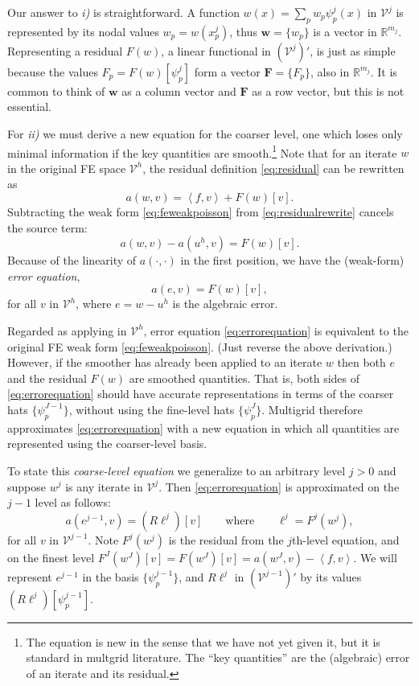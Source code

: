 \documentclass[letterpaper,final,12pt,reqno]{amsart}
\theoremstyle{claim}
\newcommand{\RR}{\mathbb{R}}
\newcommand{\bw}{\mathbf{w}}
\newcommand{\bF}{\mathbf{F}}
\newcommand{\ip}[2]{\left<#1,#2\right>}
\numberwithin{equation}{section}
\numberwithin{figure}{section}
\numberwithin{table}{section}
\numberwithin{theorem}{section}
\begin{document}
Our answer to \emph{i)} is straightforward.  A function $w(x) = \sum_p w_p \psi_p^j(x)$ in $\mathcal{V}^j$ is represented by its nodal values $w_p=w(x_p^j)$, thus $\bw = \{w_p\}$ is a vector in $\RR^{m_j}$.  Representing a residual $F(w)$, a linear functional in $(\mathcal{V}^j)'$, is just as simple because the values $F_p = F(w)[\psi_p^j]$ form a vector $\bF=\{F_p\}$, also in $\RR^{m_j}$.  It is common to think of $\bw$ as a column vector and $\bF$ as a row vector, but this is not essential.

For \emph{ii)} we must derive a new equation for the coarser level, one which loses only minimal information if the key quantities are smooth.\footnote{The equation is new in the sense that we have not yet given it, but it is standard in multgrid literature.  The ``key quantities'' are the (algebraic) error of an iterate and its residual.}  Note that for an iterate $w$ in the original FE space $\mathcal{V}^h$, the residual definition \eqref{eq:residual} can be rewritten as
\begin{equation}
  a(w,v) = \ip{f}{v} + F(w)[v].  \label{eq:residualrewrite}
\end{equation}
Subtracting the weak form \eqref{eq:feweakpoisson} from \eqref{eq:residualrewrite} cancels the source term:
\begin{equation}
  a(w,v) - a(u^h,v) = F(w)[v].  \label{eq:errorequationearly}
\end{equation}
Because of the linearity of $a(\cdot,\cdot)$ in the first position, we have the (weak-form) \emph{error equation},
\begin{equation}
  a(e,v) = F(w)[v],  \label{eq:errorequation}
\end{equation}
for all $v$ in $\mathcal{V}^h$, where $e=w-u^h$ is the algebraic error.

Regarded as applying in $\mathcal{V}^h$, error equation \eqref{eq:errorequation} is equivalent to the original FE weak form \eqref{eq:feweakpoisson}.  (Just reverse the above derivation.)  However, if the smoother has already been applied to an iterate $w$ then both $e$ and the residual $F(w)$ are smoothed quantities.  That is, both sides of \eqref{eq:errorequation} should have accurate representations in terms of the coarser hats $\{\psi_p^{J-1}\}$, without using the fine-level hats $\{\psi_p^{J}\}$.  Multigrid therefore approximates \eqref{eq:errorequation} with a new equation in which all quantities are represented using the coarser-level basis.

To state this \emph{coarse-level equation} we generalize to an arbitrary level $j>0$ and suppose $w^j$ is any iterate in $\mathcal{V}^j$.  Then \eqref{eq:errorequation} is approximated on the $j-1$ level as follows:
\begin{equation}
  a(e^{j-1},v) = (R\ell^j)[v] \qquad \text{where} \qquad \ell^j = F^j(w^j),  \label{eq:coarsecorrection}
\end{equation}
for all $v$ in $\mathcal{V}^{j-1}$.  Note $F^j(w^j)$ is the residual from the $j$th-level equation, and on the finest level $F^J(w^J)[v] = F(w^J)[v] = a(w^J,v) - \ip{f}{v}$.  We will represent $e^{j-1}$ in the basis $\{\psi_p^{j-1}\}$, and $R\ell^j$  in $(\mathcal{V}^{j-1})'$ by its values $(R\ell^j)[\psi_p^{j-1}]$.
\end{document}
